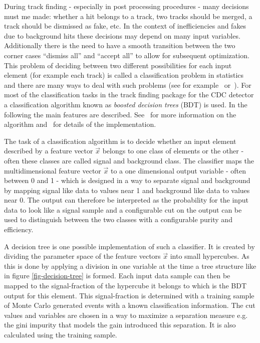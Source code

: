 During track finding - especially in post processing procedures - many decisions must me made: whether a hit belongs to a track, two tracks should be merged, a track should be dismissed as fake, etc. In the context of inefficiencies and fakes due to background hits these decisions may depend on many input variables. Additionally there is the need to have a smooth transition between the two corner cases ``dismiss all'' and ``accept all'' to allow for subsequent optimization. This problem of deciding between two different possibilities for each input element (for example each track) is called a classification problem in statistics and there are many ways to deal with such problems (see for example~\cite{cowan} or~\cite{blobel}). For most of the classification tasks in the track finding package for the CDC detector a classification algorithm known as \emph{boosted decision trees} (BDT) is used. In the following the main features are described. See~\cite{friedman} for more information on the algorithm and~\cite{keck} for details of the implementation.

The task of a classification algorithm is to decide whether an input element described by a feature vector $\vec x$ belongs to one class of elements or the other - often these classes are called signal and background class. The classifier maps the multidimensional feature vector $\vec x$ to a one dimensional output variable - often between 0 and 1 - which is designed in a way to separate signal and background by mapping signal like data to values near 1 and background like data to values near 0. The output can therefore be interpreted as the probability for the input data to look like a signal sample and a configurable cut on the output can be used to distinguish between the two classes with a configurable purity and efficiency.

A decision tree is one possible implementation of such a classifier. It is created by dividing the parameter space of the feature vectors $\vec x$ into small hypercubes. As this is done by applying a division in one variable at the time a tree structure like in figure \ref{fig-decision-tree} is formed. Each input data sample can then be mapped to the signal-fraction of the hypercube it belongs to which is the BDT output for this element. This signal-fraction is determined with a training sample of Monte Carlo generated events with a known classification information. The cut values and variables are chosen in a way to maximize a separation measure e.g. the gini impurity that models the gain introduced this separation. It is also calculated using the training sample. 

